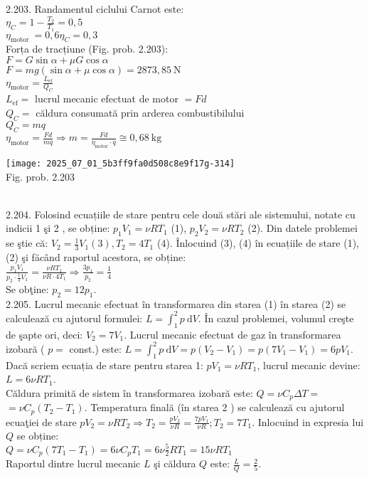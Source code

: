 2.203. Randamentul ciclului Carnot este:\\ $\eta_{C}=1-\frac{T_{2}}{T_{1}}=0,5$\\ $\eta_{\text {motor }}=0,6 \eta_{C}=0,3$\\ Forța de tracțiune (Fig. prob. 2.203):\\ $F=G \sin \alpha+\mu G \cos \alpha$\\ $F=m g(\sin \alpha+\mu \cos \alpha)=2873,85 \mathrm{~N}$\\ $\eta_{\text{motor}}=\frac{L_{\text{ef}}}{Q_{C}}$\\ $L_{\text{ef}}=$ lucrul mecanic efectuat de motor $=F d$\\ $Q_{C}=$ căldura consumată prin arderea combustibilului\\ $Q_{C}=m q$\\ $\eta_{\text{motor}}=\frac{F d}{m q} \Rightarrow m=\frac{F d}{\eta_{\text{motor}} \cdot q} \cong 0,68 \mathrm{~kg}$\\ \begin{center} \texttt{[image: 2025\_07\_01\_5b3ff9fa0d508c8e9f17g-314]}\\ Fig. prob. 2.203 \end{center}\\

2.204. Folosind ecuațiile de stare pentru cele două stări ale sistemului, notate cu indicii 1 şi 2 , se obține: $p_{1} V_{1}=\nu R T_{1}$ (1), $p_{2} V_{2}=\nu R T_{2}$ (2). Din datele problemei se ştie că: $V_{2}=\frac{1}{3} V_{1}(3), T_{2}=4 T_{1}$ (4). Înlocuind (3), (4) în ecuațiile de stare (1), (2) şi fäcând raportul acestora, se obține:\\ $\frac{p_{1} V_{1}}{p_{2} \cdot \frac{1}{3} V_{1}}=\frac{\nu R T_{1}}{\nu R \cdot 4 T_{1}} \Rightarrow \frac{3 p_{1}}{p_{2}}=\frac{1}{4} \tag{5}$\\ Se obţine: $p_{2}=12 p_{1}$.\\

2.205. Lucrul mecanic efectuat în transformarea din starea (1) în starea (2) se calculează cu ajutorul formulei: $L=\int_{1}^{2} p \mathrm{~d} V$. În cazul problemei, volumul creşte de şapte ori, deci: $V_{2}=7 V_{1}$. Lucrul mecanic efectuat de gaz în transformarea izobară ( $p=$ const.) este: $L=\int_{1}^{2} p \mathrm{~d} V=p\left(V_{2}-V_{1}\right)=p\left(7 V_{1}-V_{1}\right)=6 p V_{1}$. Dacă scriem ecuația de stare pentru starea 1: $p V_{1}=\nu R T_{1}$, lucrul mecanic devine: $L=6 \nu R T_{1}$.\\ Căldura primită de sistem în transformarea izobară este: $Q=\nu C_{p} \Delta T=$ $=\nu C_{p}\left(T_{2}-T_{1}\right)$. Temperatura finală (în starea 2 ) se calculează cu ajutorul ecuaţiei de stare $p V_{2}=\nu R T_{2} \Rightarrow T_{2}=\frac{p V_{2}}{\nu R}=\frac{7 p V_{1}}{\nu R} ; T_{2}=7 T_{1}$. Inlocuind in expresia lui $Q$ se obține:\\ $Q=\nu C_{p}\left(7 T_{1}-T_{1}\right)=6 \nu C_{p} T_{1}=6 \nu \frac{5}{2} R T_{1}=15 \nu R T_{1}$\\ Raportul dintre lucrul mecanic $L$ şi căldura $Q$ este: $\frac{L}{Q}=\frac{2}{5}$.\\

